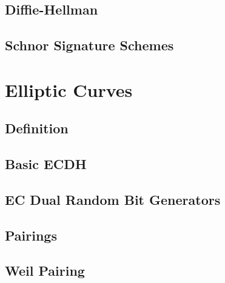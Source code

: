 \documentclass[12pt]{article}
\begin{document}
\subsection{Diffie-Hellman}
\subsection{Schnor Signature Schemes}

\section{Elliptic Curves}
\subsection{Definition}
\subsection{Basic ECDH}
\subsection{EC Dual Random Bit Generators}
\subsection{Pairings}
\subsection{Weil Pairing}
\end{document}
